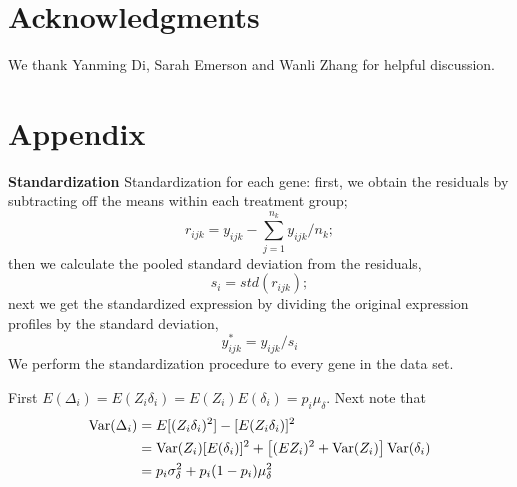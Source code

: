 \documentclass[useAMS,usenatbib, galley]{biom}
\begin{document}
	
	
	
	
	
	\section{Acknowledgments}\label{section:acknowledgment}
	
	We thank Yanming Di, Sarah Emerson and Wanli Zhang for helpful discussion. 
	
	\newpage
	
	
	
	
	\newpage
	\newpage
	
	\section*{Appendix}\label{section:appendix}
	
		
		\textbf{Standardization} 
		Standardization for each gene: first, we obtain the residuals by subtracting off the means within each treatment group;
		\begin{equation}
		r_{ijk} = y_{ijk} - \sum_{j=1}^{n_k}{y}_{ijk}/n_k;
		\end{equation}
		then we calculate the pooled standard deviation from the residuals,
		\begin{equation}
		s_i = \textit{std}(r_{ijk});
		\end{equation}
		next we get the standardized expression by dividing the original expression profiles by the standard deviation,
		\begin{equation}
		y^{\ast}_{ijk} = y_{ijk}/s_i
		\end{equation}
		We perform the standardization procedure to every gene in the data set. 
		
	
	First $E(\Delta_i) = E(Z_i\delta_i) = E(Z_i)E(\delta_i) = p_i\mu_{\delta}$. Next note that  
	\begin{equation}\notag
	\begin{aligned}
	\text{Var}(\Delta_i) & = E[(Z_i\delta_i)^2]- [E(Z_i\delta_i)]^2 \\
	& = \text{Var}(Z_i)[E(\delta_i)]^2 + \left[(EZ_i)^2 + \text{Var}(Z_i)\right]\text{Var}(\delta_i) \\
	& =p_i\sigma_{\delta}^2 + p_i(1-p_i)\mu_{\delta}^2
	\end{aligned}
	\end{equation}
	
\end{document}
